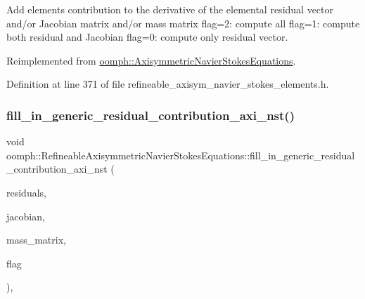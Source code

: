 Add element\textquotesingle{}s contribution to the derivative of the elemental residual vector and/or Jacobian matrix and/or mass matrix flag=2\+: compute all flag=1\+: compute both residual and Jacobian flag=0\+: compute only residual vector. 



Reimplemented from \hyperlink{classoomph_1_1AxisymmetricNavierStokesEquations_a19a4b0c9d98bd79212fe8b507d44f7ab}{oomph\+::\+Axisymmetric\+Navier\+Stokes\+Equations}.



Definition at line 371 of file refineable\+\_\+axisym\+\_\+navier\+\_\+stokes\+\_\+elements.\+h.

\mbox{\label{classoomph_1_1RefineableAxisymmetricNavierStokesEquations_a9ac92aefcee6fd7ef3e7c61af9bd305f}} 
\subsubsection{\texorpdfstring{fill\+\_\+in\+\_\+generic\+\_\+residual\+\_\+contribution\+\_\+axi\+\_\+nst()}{fill\_in\_generic\_residual\_contribution\_axi\_nst()}}
{\footnotesize\ttfamily void oomph\+::\+Refineable\+Axisymmetric\+Navier\+Stokes\+Equations\+::fill\+\_\+in\+\_\+generic\+\_\+residual\+\_\+contribution\+\_\+axi\+\_\+nst (\begin{DoxyParamCaption}\item[{\hyperlink{classoomph_1_1Vector}{Vector}$<$ double $>$ \&}]{residuals,  }\item[{\hyperlink{classoomph_1_1DenseMatrix}{Dense\+Matrix}$<$ double $>$ \&}]{jacobian,  }\item[{\hyperlink{classoomph_1_1DenseMatrix}{Dense\+Matrix}$<$ double $>$ \&}]{mass\+\_\+matrix,  }\item[{unsigned}]{flag }\end{DoxyParamCaption})\hspace{0.3cm}{\ttfamily [private]}, {\ttfamily [virtual]}}



